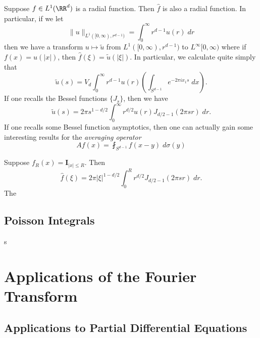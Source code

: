 Suppose $f \in L^1(\RR^d)$ is a radial function. Then $\widehat{f}$ is also a radial function. In particular, if we let
%
\[ \| u \|_{L^1([0,\infty), r^{d-1})} = \int_0^\infty r^{d-1} u(r)\; dr \]
%
then we have a transform $u \mapsto \tilde{u}$ from $L^1([0,\infty), r^{d-1})$ to $L^\infty[0,\infty)$ where if $f(x) = u(|x|)$, then $\widehat{f}(\xi) = \tilde{u}(|\xi|)$. In particular, we calculate quite simply that
%
\[ \tilde{u}(s) = V_d \int_0^\infty r^{d-1} u(r) \left( \int_{S^{d-1}} e^{-2 \pi i x_1 s}\; dx \right). \]
%
If one recalls the Bessel functions $\{ J_s \}$, then we have
%
\[ \tilde{u}(s) = 2\pi s^{1 - d/2} \int_0^\infty r^{d/2} u(r) J_{d/2-1}(2 \pi s r)\; dr. \]
%
If one recalls some Bessel function asymptotics, then one can actually gain some interesting results for the \emph{averaging operator}
%
\[ Af(x) = \fint_{S^{d-1}} f(x-y)\; d\sigma(y) \]
%

\begin{example}
    Suppose $f_R(x) = \mathbf{I}_{|x| \leq R}$. Then
    \[ \widehat{f}(\xi) = 2 \pi |\xi|^{1-d/2} \int_0^R r^{d/2} J_{d/2-1}(2 \pi s r)\; dr. \]
    The 
\end{example}





\section{Poisson Integrals}

s



\chapter{Applications of the Fourier Transform}

\section{Applications to Partial Differential Equations}

